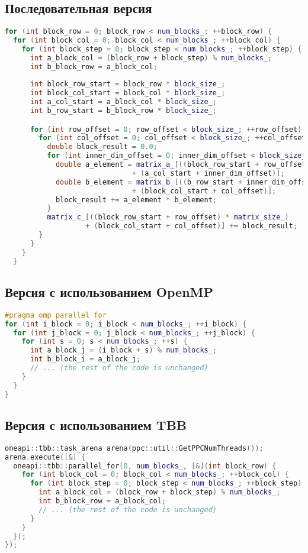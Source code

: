 \documentclass[14pt,a4paper]{extarticle}
\begin{document}
\subsection{Последовательная версия}
\begin{lstlisting}[frame=single,language=C++]
for (int block_row = 0; block_row < num_blocks_; ++block_row) {
  for (int block_col = 0; block_col < num_blocks_; ++block_col) {
    for (int block_step = 0; block_step < num_blocks_; ++block_step) {
      int a_block_col = (block_row + block_step) % num_blocks_;
      int b_block_row = a_block_col;
      
      int block_row_start = block_row * block_size_;
      int block_col_start = block_col * block_size_;
      int a_col_start = a_block_col * block_size_;
      int b_row_start = b_block_row * block_size_;

      for (int row_offset = 0; row_offset < block_size_; ++row_offset) {
        for (int col_offset = 0; col_offset < block_size_; ++col_offset) {
          double block_result = 0.0;
          for (int inner_dim_offset = 0; inner_dim_offset < block_size_; ++inner_dim_offset) {
            double a_element = matrix_a_[((block_row_start + row_offset) * matrix_size_) 
                              + (a_col_start + inner_dim_offset)];
            double b_element = matrix_b_[((b_row_start + inner_dim_offset) * matrix_size_) 
                              + (block_col_start + col_offset)];
            block_result += a_element * b_element;
          }
          matrix_c_[((block_row_start + row_offset) * matrix_size_) 
                   + (block_col_start + col_offset)] += block_result;
        }
      }
    }
  }
\end{lstlisting}

\subsection{Версия с использованием OpenMP}
\begin{lstlisting}[frame=single,language=C++]
#pragma omp parallel for
for (int i_block = 0; i_block < num_blocks_; ++i_block) {
  for (int j_block = 0; j_block < num_blocks_; ++j_block) {
    for (int s = 0; s < num_blocks_; ++s) {
      int a_block_j = (i_block + s) % num_blocks_;
      int b_block_i = a_block_j;
      // ... (the rest of the code is unchanged)
    }
  }
}
\end{lstlisting}

\subsection{Версия с использованием TBB}
\begin{lstlisting}[frame=single,language=C++]
oneapi::tbb::task_arena arena(ppc::util::GetPPCNumThreads());
arena.execute([&] {
  oneapi::tbb::parallel_for(0, num_blocks_, [&](int block_row) {
    for (int block_col = 0; block_col < num_blocks_; ++block_col) {
      for (int block_step = 0; block_step < num_blocks_; ++block_step) {
        int a_block_col = (block_row + block_step) % num_blocks_;
        int b_block_row = a_block_col;
        // ... (the rest of the code is unchanged)
      }
    }
  });
});
\end{lstlisting}
\newpage
\end{document}
